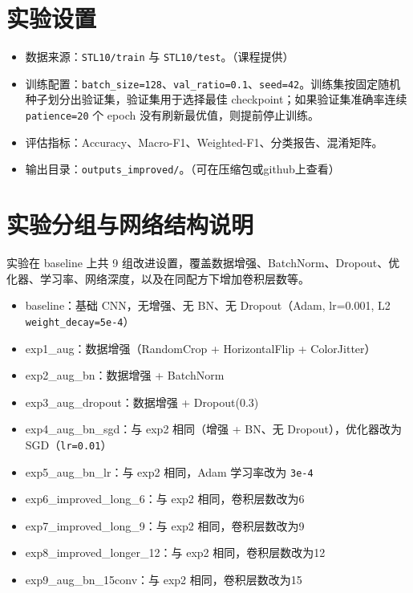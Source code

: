 \documentclass[UTF8]{ctexart}
\begin{document}
\section{实验设置}
\begin{itemize}
  \item 数据来源：\texttt{STL10/train} 与 \texttt{STL10/test}。（课程提供）
  \item 训练配置：\texttt{batch\_size=128}、\texttt{val\_ratio=0.1}、\texttt{seed=42}。训练集按固定随机种子划分出验证集，验证集用于选择最佳 checkpoint；如果验证集准确率连续 \texttt{patience=20} 个 epoch 没有刷新最优值，则提前停止训练。
  \item 评估指标：Accuracy、Macro-F1、Weighted-F1、分类报告、混淆矩阵。
  \item 输出目录：\texttt{outputs\_improved/}。（可在压缩包或github上查看）
\end{itemize}


\section{实验分组与网络结构说明}
实验在 baseline 上共 9 组改进设置，覆盖数据增强、BatchNorm、Dropout、优化器、学习率、网络深度，以及在同配方下增加卷积层数等。
\begin{itemize}
  \item baseline：基础 CNN，无增强、无 BN、无 Dropout（Adam, lr=0.001, L2 \texttt{weight\_decay=5e-4}）
  \item exp1\_aug：数据增强（RandomCrop + HorizontalFlip + ColorJitter）
  \item exp2\_aug\_bn：数据增强 + BatchNorm
  \item exp3\_aug\_dropout：数据增强 + Dropout(0.3)
  \item exp4\_aug\_bn\_sgd：与 exp2 相同（增强 + BN、无 Dropout），优化器改为 SGD（\texttt{lr=0.01}）
  \item exp5\_aug\_bn\_lr：与 exp2 相同，Adam 学习率改为 \texttt{3e-4}
  \item exp6\_improved\_long\_6：与 exp2 相同，卷积层数改为6
  \item exp7\_improved\_long\_9：与 exp2 相同，卷积层数改为9
  \item exp8\_improved\_longer\_12：与 exp2 相同，卷积层数改为12
  \item exp9\_aug\_bn\_15conv：与 exp2 相同，卷积层数改为15
\end{itemize}

\clearpage
\end{document}
